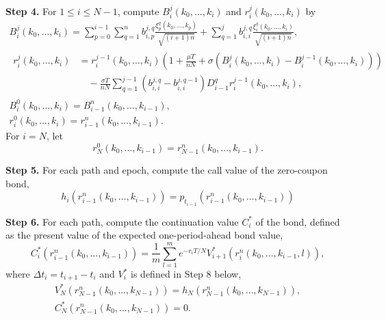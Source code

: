 \documentclass[10pt,a4paper]{amsart}
\numberwithin{equation}{section}
\begin{document}
\noindent\textbf{Step 4.} For $1\le i \le N-1$, compute 
$B_{i}^{j}\left(k_0,\dots,k_i\right)$ and $r_{i}^{j}\left(k_0,\dots,k_i\right)$ by
\begin{equation}
\label{pathgeneration}
\begin{gathered}
 B_{i}^{j}\left(k_0,\dots,k_i\right)
 =\sum_{p=0}^{i-1}\sum_{q=1}^{n}b_{i,p}^{j,q} \frac{\xi_p^q\left(k_0,\dots,k_p\right)}
 {\sqrt{\left(i+1\right)n}} +\sum_{q=1}^{j}b_{i,i}^{j,q} 
 \frac{\xi_i^q\left(k_0,\dots,k_i\right)}{\sqrt{\left(i+1\right)n}} ,\\
\begin{aligned}
r_{i}^{j}\left(k_0,\dots,k_i\right)
&= r_{i}^{j-1}\left(k_0,\dots,k_i\right)\left(1+\frac{\mu T}{nN}+\sigma\left(B_{i}^{j}
 \left(k_0,\dots,k_i\right)-B_{i}^{j-1}\left(k_0,\dots,k_i\right)\right)\right)\\
&\quad - \frac{\sigma T}{nN} \sum_{q=1}^{j-1}\left(b_{i,i}^{j,q}-b_{i,i}^{j,q-1}\right)
  D_{i-1}^q r_{i}^{j-1}\left(k_0,\dots,k_i\right) ,
\end{aligned}\\
 B_{i}^{0}\left(k_0,\dots,k_i\right)=B_{i-1}^{n}\left(k_0,\dots,k_{i-1}\right),\\
 r_{i}^{0}\left(k_0,\dots,k_i\right)=r_{i-1}^{n}\left(k_0,\dots,k_{i-1}\right).
\end{gathered}
\end{equation}
For $i=N$, let
\[
 r_{N}^{0}\left(k_0,\dots,k_{i-1}\right)=r_{N-1}^{n}\left(k_0,\dots,k_{i-1}\right).
\]
\smallskip

\noindent\textbf{Step 5.} For each path and epoch, compute the call value of the 
zero-coupon bond,
\[
 h_i\left(r_{i-1}^{n}\left(k_0,\dots,k_{i-1}\right)\right)=
 p_{t_{i-1}}\left(r_{i-1}^n\left(k_0,\dots,k_{i-1}\right)\right)
\]
\smallskip

\noindent\textbf{Step 6.} For each path, compute the continuation value $C_i^*$ of 
the bond, defined as the present value of the expected one-period-ahead bond value,
\[
 C_i^*\left(r_{i-1}^n\left(k_0, \dots, k_{i-1}\right)\right)=\frac{1}{m} \sum_{l=1}^m
 e^{- r_iT/N}
V_{i+1}^*\left(r_i^n\left(k_0, \dots, k_{i-1}, l\right)\right) ,
\]
where $\Delta t_i=t_{i+1}-t_i$ and $V_i^*$ is defined in Step 8 below,
\begin{gather*}
 V_N^*\left(r_{N-1}^{n}\left(k_0,\dots,k_{N-1}\right)\right)
 = h_N\left(r_{N-1}^{n}\left(k_0,\dots,k_{N-1}\right)\right),\\
 C_N^*\left(r_{N-1}^{n}\left(k_0,\dots,k_{N-1}\right)\right)= 0.
\end{gather*}
\smallskip
\end{document}
